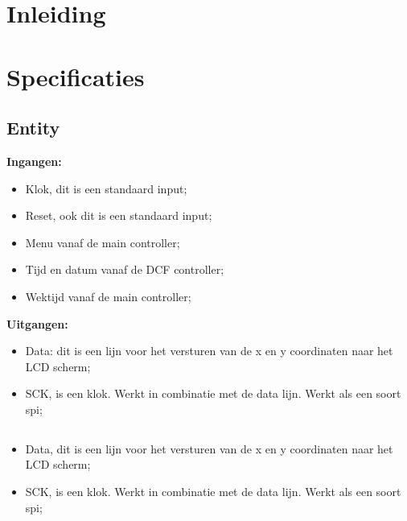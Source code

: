 \section{Inleiding}

\section{Specificaties}

\subsection{Entity}
\textbf{Ingangen:}

\begin{itemize}
\item Klok, dit is een standaard input;
\item Reset, ook dit is een standaard input;
\item Menu vanaf de main controller;
\item Tijd en datum vanaf de DCF controller;
\item Wektijd vanaf de main controller;
\end{itemize}

\textbf{Uitgangen:}
\begin{itemize}
\item Data: dit is een lijn voor het versturen van de x en y coordinaten naar het LCD scherm;
\item SCK, is een klok. Werkt in combinatie met de data lijn. Werkt als een soort spi;
\end{itemize}

\subsection{}
\begin{itemize}
\item Data, dit is een lijn voor het versturen van de x en y coordinaten naar het LCD scherm;
\item SCK, is een klok. Werkt in combinatie met de data lijn. Werkt als een soort spi;
\end{itemize}



